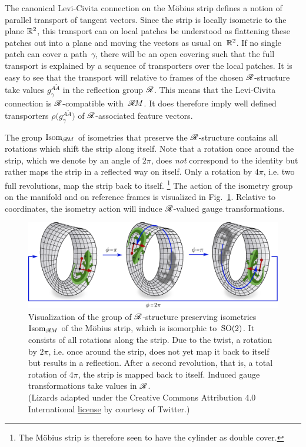 The canonical Levi-Civita connection on the M\"obius strip defines a notion of parallel transport of tangent vectors.
Since the strip is locally isometric to the plane $\mathbb{R}^2$, this transport can on local patches be understood as flattening these patches out into a plane and moving the vectors as usual on~$\mathbb{R}^2$.
If no single patch can cover a path~$\gamma$, there will be an open covering such that the full transport is explained by a sequence of transporters over the local patches.
It is easy to see that the transport will relative to frames of the chosen $\mathscr{R}$-structure take values $g_\gamma^{A\widetilde{A}}$ in the reflection group $\mathscr{R}$.
This means that the Levi-Civita connection is $\mathscr{R}$-compatible with~$\mathscr{R}\mkern-1.8muM$.
It does therefore imply well defined transporters $\rho\big( g_\gamma^{A\widetilde{A}} \big)$ of $\mathscr{R}$-associated feature vectors.


The group $\operatorname{Isom}_{\mathscr{R}\mkern-1.8muM}$ of isometries that preserve the $\mathscr{R}$-structure contains all rotations which shift the strip along itself.
Note that a rotation once around the strip, which we denote by an angle of $2\pi$, does \emph{not} correspond to the identity but rather maps the strip in a reflected way on itself.
Only a rotation by $4\pi$, i.e. two full revolutions, map the strip back to itself.%
\footnote{
    The M\"obius strip is therefore seen to have the cylinder as double cover.
}
The action of the isometry group on the manifold and on reference frames is visualized in Fig.~\ref{fig:mobius_conv_isometries}.
Relative to coordinates, the isometry action will induce $\mathscr{R}$-valued gauge transformations.


\begin{figure}
    \centering
    \includegraphics[width=\columnwidth]{figures/mobius_conv_isom.pdf}
    \caption{\small
        Visualization of the group of $\mathscr{R}$-structure preserving isometries $\operatorname{Isom}_{\mathscr{R}\mkern-1.8muM}$ of the M\"obius strip, which is isomorphic to~$\operatorname{SO}(2)$.
        It consists of all rotations along the strip.
        Due to the twist, a rotation by $2\pi$, i.e. once around the strip, does not yet map it back to itself but results in a reflection.
        After a second revolution, that is, a total rotation of $4\pi$, the strip is mapped back to itself.
        Induced gauge transformations take values in $\mathscr{R}$.
        {
        \\ \color{gray} \scriptsize
            (Lizards adapted under the Creative Commons Attribution 4.0 International
            \href{https://github.com/twitter/twemoji/blob/gh-pages/LICENSE-GRAPHICS}{\underline{license}}
            by courtesy of Twitter.)
        }
    }
    \label{fig:mobius_conv_isometries}
\end{figure}








